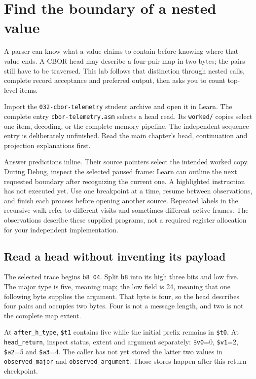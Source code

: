 \chapter{Find the boundary of a nested value}
\label{revision:lab-cbor}

A parser can know what a value claims to contain before knowing where that value
ends. A CBOR head may describe a four-pair map in two bytes; the pairs still have
to be traversed. This lab follows that distinction through nested calls, complete
record acceptance and preferred output, then asks you to count top-level items.

Import the \texttt{032-cbor-telemetry} student archive and open it in Learn.
The complete entry \texttt{cbor-telemetry.asm} selects a head read. Its
\texttt{worked/} copies select one item, decoding, or the complete memory
pipeline. The independent sequence entry is deliberately unfinished. Read the
main chapter's head, continuation and projection explanations first.

Answer predictions inline. Their source pointers select the intended worked
copy. During Debug, inspect the selected paused frame: Learn can outline the next
requested boundary after recognizing the current one. A highlighted instruction
has not executed yet. Use one breakpoint at a time, resume between observations,
and finish each process before opening another source. Repeated labels in the
recursive walk refer to different visits and sometimes different active frames.
The observations describe these supplied programs, not a required register
allocation for your independent implementation.

\section{Read a head without inventing its payload}

The selected trace begins \texttt{b8 04}. Split \texttt{b8} into its high three
bits and low five. The major type is five, meaning map; the low field is 24,
meaning that one following byte supplies the argument. That byte is four, so
the head describes four pairs and occupies two bytes. Four is not a message
length, and two is not the complete map extent.

At \texttt{after\_h\_type}, \texttt{\$t1} contains five while the initial
prefix remains in \texttt{\$t0}. At \texttt{head\_return}, inspect status,
extent and argument separately: \texttt{\$v0}=0, \texttt{\$v1}=2,
\texttt{\$a2}=5 and \texttt{\$a3}=4. The caller has not yet stored the latter
two values in \texttt{observed\_major} and \texttt{observed\_argument}.
Those stores happen after this return checkpoint.


